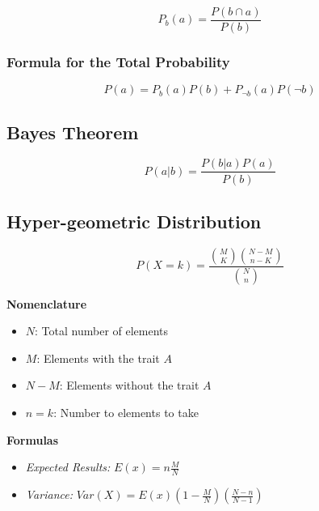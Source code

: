 \[P_b (a) = \frac{P(b \cap a)}{P(b)}\]

\subsubsection{Formula for the Total Probability}

\[P(a) = P_b (a) P(b) + P_{\neg b}(a) P(\neg b)\]

\subsection{Bayes Theorem}

\[P(a | b) = \frac{P(b | a) P(a)}{P(b)}\]

\subsection{Hyper-geometric Distribution}

\[P(X = k) = \frac{\binom{M}{K} \binom{N - M}{n - K}}{\binom{N}{n}}\]

\textbf{Nomenclature}
\begin{itemize}[label=\(-\)]
    \item \(N\): Total number of elements
    \item \(M\): Elements with the trait \(A\)
    \item \(N - M\): Elements without the trait \(A\)
    \item \(n = k\): Number to elements to take
\end{itemize}

\textbf{Formulas }
\begin{itemize}[label=\(-\)]
    \item \emph{Expected Results: } \(E(x) = n \frac{M}{N}\)
    \item \emph{Variance: } \(Var(X) = E(x)\left(1 - \frac{M}{N}\right) \left(\frac{N - n}{N - 1}\right)\)
\end{itemize}

